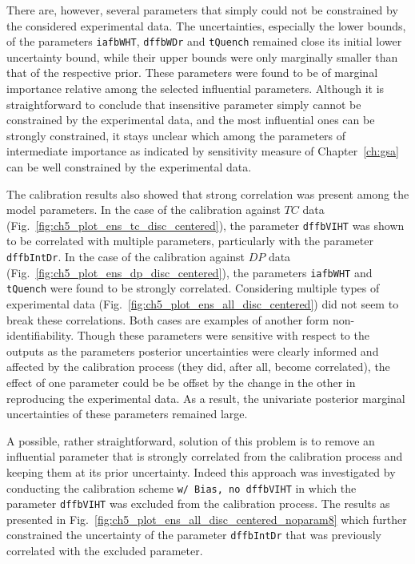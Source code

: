 There are, however, several parameters that simply could not be constrained by the considered experimental data.
The uncertainties, especially the lower bounds, of the parameters \texttt{iafbWHT}, \texttt{dffbWDr} and \texttt{tQuench} remained close its initial lower uncertainty bound,
while their upper bounds were only marginally smaller than that of the respective prior. 
These parameters were found to be of marginal importance relative among the selected influential parameters.
Although it is straightforward to conclude that insensitive parameter simply cannot be constrained by the experimental data, and the most influential ones can be strongly constrained, it stays unclear which among the parameters of intermediate importance as indicated by sensitivity measure of Chapter~\ref{ch:gsa} can be well constrained by the experimental data.

The calibration results also showed that strong correlation was pres\-ent among the model parameters.
In the case of the calibration against $TC$ data (Fig.~\ref{fig:ch5_plot_ens_tc_disc_centered}), the parameter \texttt{dffbVIHT} was shown to be correlated with multiple parameters, particularly with the parameter \texttt{dffbIntDr}.
In the case of the calibration against $DP$ data (Fig.~\ref{fig:ch5_plot_ens_dp_disc_centered}), the parameters \texttt{iafbWHT} and \texttt{tQuench} were found to be strongly correlated. 
Considering multiple types of experimental data (Fig.~\ref{fig:ch5_plot_ens_all_disc_centered}) did not seem to break these correlations.
Both cases are examples of another form non-identifiability.
Though these parameters were sensitive with respect to the outputs as the parameters posterior uncertainties were clearly informed and affected by the calibration process (they did, after all, become correlated), 
the effect of one parameter could be be offset by the change in the other in reproducing the experimental data. 
As a result, the univariate posterior marginal uncertainties of these parameters remained large.

A possible, rather straightforward, solution of this problem is to remove an influential parameter that is strongly correlated from the calibration process \cite{Brun2002} and keeping them at its prior uncertainty.
Indeed this approach was investigated by conducting the calibration scheme \texttt{w/ Bias, no dffbVIHT} in which the parameter \texttt{dffbVIHT} was excluded from the calibration process.
The results as presented in Fig.~\ref{fig:ch5_plot_ens_all_disc_centered_noparam8} which further constrained the uncertainty of the parameter \texttt{dffbIntDr} that was previously correlated with the excluded parameter.


